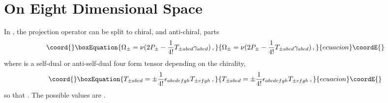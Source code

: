 \documentclass[a4paper,11pt]{article}
\providecommand{\const}{{\nu}}
\def\const{{\nu}}
\begin{document}
\section{On Eight Dimensional Space\label{EIGHT}}
In \coordHE{}, the  projection operator can be split to  chiral, \myHighlight{$+$}\coordHE{} and anti-chiral, \myHighlight{$-$}\coordHE{} parts
\begin{equation}\coord{}\boxEquation{
\Omega_{\pm}=\const(2P_{\pm}-\frac{1}{4!} T_{\pm abcd}\gamma_{abcd})\,,
\label{8p}
}{
\Omega_{\pm}=\const(2P_{\pm}-\frac{1}{4!} T_{\pm abcd}\gamma_{abcd})\,,
}{ecuacion}\coordE{}\end{equation}
where  \coordHE{} is a self-dual or anti-self-dual  four form tensor depending on the chirality, \myHighlight{$\pm$}\coordHE{}
\begin{equation}\coord{}\boxEquation{
T_{\pm abcd}=\pm\frac{1}{4!}\epsilon_{abcdefgh}T_{\pm efgh}\,,
}{
T_{\pm abcd}=\pm\frac{1}{4!}\epsilon_{abcdefgh}T_{\pm efgh}\,,
}{ecuacion}\coordE{}\end{equation}
so that \coordHE{}.  The possible \myHighlight{$\const$}\coordHE{} values are \myHighlight{$\const=N/16,~\,N=1,2,\cdots 8$}\coordHE{}.
\end{document}
